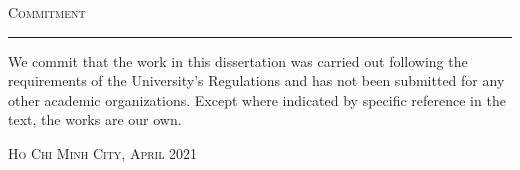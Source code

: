 \thispagestyle{empty}
\vspace*{3cm}
\noindent\Huge\textsc{Commitment}\\
\normalsize
\noindent\rule[2pt]{\textwidth}{0.8pt}
\hspace*{5cm}

We commit that the work in this dissertation was carried out following the requirements of the University’s Regulations and has not been submitted for any other academic organizations. Except where indicated by specific reference in the text, the works are our own.
	
	\hfill \textsc{Ho Chi Minh City, April 2021}
	
\cleardoublepage

